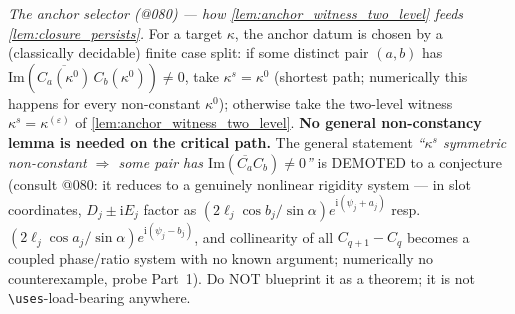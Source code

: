 \emph{The anchor selector (@080) --- how \cref{lem:anchor_witness_two_level}
feeds \cref{lem:closure_persists}.} For a target $\kappa$, the anchor datum is
chosen by a (classically decidable) finite case split: if some distinct pair
$(a,b)$ has $\mathrm{Im}(\overline{C_a(\kappa^0)}\,C_b(\kappa^0)) \ne 0$, take
$\kappa^s = \kappa^0$ (shortest path; numerically this happens for every
non-constant $\kappa^0$); otherwise take the two-level witness
$\kappa^s = \kappa^{(\varepsilon)}$ of \cref{lem:anchor_witness_two_level}.
\textbf{No general non-constancy lemma is needed on the critical path.} The
general statement \emph{``$\kappa^s$ symmetric non-constant $\Rightarrow$ some
pair has $\mathrm{Im}(\overline{C_a}C_b) \ne 0$''} is DEMOTED to a conjecture
(consult @080: it reduces to a genuinely nonlinear rigidity system --- in slot
coordinates, $D_j \pm \mathrm{i}E_j$ factor as
$(2\ell_j\cos b_j/\sin\alpha)e^{\mathrm{i}(\psi_j + a_j)}$ resp.\
$(2\ell_j\cos a_j/\sin\alpha)e^{\mathrm{i}(\psi_j - b_j)}$, and collinearity of
all $C_{q+1} - C_q$ becomes a coupled phase/ratio system with no known
argument; numerically no counterexample, probe Part~1). Do NOT blueprint it as
a theorem; it is not \texttt{\textbackslash uses}-load-bearing anywhere.

